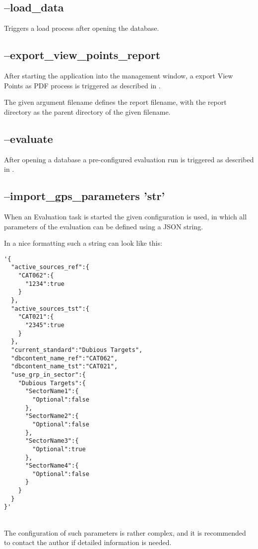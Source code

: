 \subsection{--load\_data}

Triggers a load process after opening the database.

\subsection{--export\_view\_points\_report}

After starting the application into the management window, a export View Points as PDF process is triggered as described in
.

The given argument filename defines the report filename, with the report directory as the parent directory of the given filename.

\subsection{--evaluate}

After opening a database a pre-configured evaluation run is triggered as described in .

\subsection{--import\_gps\_parameters 'str'}

When an Evaluation task is started the given configuration is used, in which all parameters of the evaluation can be defined using a JSON string.

In a nice formatting such a string can look like this:
\begin{lstlisting}[basicstyle=\small\ttfamily]
'{
  "active_sources_ref":{
    "CAT062":{
      "1234":true
    }
  },
  "active_sources_tst":{
    "CAT021":{
      "2345":true
    }
  },
  "current_standard":"Dubious Targets",
  "dbcontent_name_ref":"CAT062",
  "dbcontent_name_tst":"CAT021",
  "use_grp_in_sector":{
    "Dubious Targets":{
      "SectorName1":{
        "Optional":false
      },
      "SectorName2":{
        "Optional":false
      },
      "SectorName3":{
        "Optional":true
      },
      "SectorName4":{
        "Optional":false
      }
    }
  }
}'
\end{lstlisting}
\ \\

The configuration of such parameters is rather complex, and it is recommended to contact the author if detailed information is needed.

